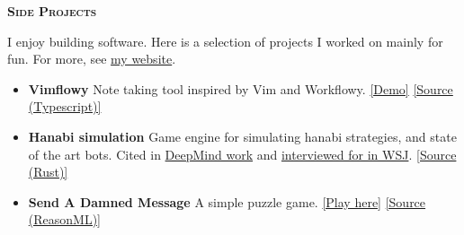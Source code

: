 \documentclass[11 pt]{article}
\begin{document}
\begin{center}\begin{Large}\textsc{\textbf{Side Projects}\\}\end{Large}\end{center}

I enjoy building software.  Here is a selection of projects I worked on mainly for fun.
For more, see \href{https://www.wuthejeff.com/projects}{my website}.


\begin{itemize}
\item \textbf{Vimflowy}
Note taking tool inspired by Vim and Workflowy. \href{https://www.wuthejeff.com/vimflowy}{[Demo]} \href{https://github.com/WuTheFWasThat/vimflowy}{[Source (Typescript)]}

\item \textbf{Hanabi simulation}
Game engine for simulating hanabi strategies, and state of the art bots.  Cited in \href{https://arxiv.org/abs/1902.00506}{DeepMind work} and \href{https://www.wsj.com/articles/why-the-card-game-hanabi-is-the-next-big-hurdle-for-artificial-intelligence-11553875351}{interviewed for in WSJ}. \href{https://github.com/WuTheFWasThat/hanabi.rs}{[Source (Rust)]}



\item \textbf{Send A Damned Message}
  A simple puzzle game.
\href{https://www.wuthejeff.com/send-a-damned-message}{[Play here]}
\href{https://github.com/WuTheFWasThat/send-a-damned-message}{[Source (ReasonML)]}





\end{itemize}
\end{document}
